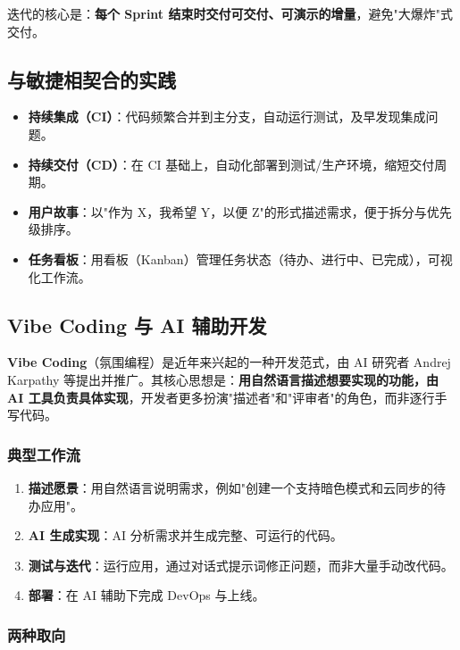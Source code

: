 \documentclass[11pt]{article}
\begin{document}
迭代的核心是：\textbf{每个 Sprint 结束时交付可交付、可演示的增量}，避免"大爆炸"式交付。

\subsection{与敏捷相契合的实践}

\begin{itemize}
    \item \textbf{持续集成（CI）}：代码频繁合并到主分支，自动运行测试，及早发现集成问题。
    \item \textbf{持续交付（CD）}：在 CI 基础上，自动化部署到测试/生产环境，缩短交付周期。
    \item \textbf{用户故事}：以"作为 X，我希望 Y，以便 Z"的形式描述需求，便于拆分与优先级排序。
    \item \textbf{任务看板}：用看板（Kanban）管理任务状态（待办、进行中、已完成），可视化工作流。
\end{itemize}

\subsection{Vibe Coding 与 AI 辅助开发}

\textbf{Vibe Coding}（氛围编程）是近年来兴起的一种开发范式，由 AI 研究者 Andrej Karpathy 等提出并推广。其核心思想是：\textbf{用自然语言描述想要实现的功能，由 AI 工具负责具体实现}，开发者更多扮演"描述者"和"评审者"的角色，而非逐行手写代码。

\subsubsection{典型工作流}

\begin{enumerate}
    \item \textbf{描述愿景}：用自然语言说明需求，例如"创建一个支持暗色模式和云同步的待办应用"。
    \item \textbf{AI 生成实现}：AI 分析需求并生成完整、可运行的代码。
    \item \textbf{测试与迭代}：运行应用，通过对话式提示词修正问题，而非大量手动改代码。
    \item \textbf{部署}：在 AI 辅助下完成 DevOps 与上线。
\end{enumerate}

\subsubsection{两种取向}
\end{document}
